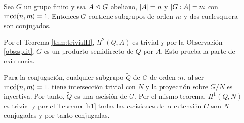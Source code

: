
\begin{teorema}\label{thmschurab} Sea $G$ un grupo finito y sea $A \trianglelefteq G$ abeliano, $\left|A\right|=n$ y $\left|G:A\right|=m$ con $\operatorname{mcd}(n,m)=1$. Entonces $G$ contiene subgrupos de orden $m$ y dos cualesquiera son conjugados.
	\begin{demostracion}
%		
%		

		Por el Teorema \ref{thm:trivialH}, $H^2(Q,A)$ es trivial y por la Observación \ref{obs:split}, $G$ es un producto semidirecto de $Q$ por $A$. Esto prueba la parte de existencia.
		
		Para la conjugación, cualquier subgrupo $\tilde Q$ de $G$ de orden $m$, al ser $\operatorname{mcd}(n,m)=1$, tiene intersección trivial con $N$ y la proyección sobre $G/N$ es inyectiva. Por tanto, $\tilde Q$ es una escisión de $G$. Por el mismo teorema, $H^1(Q,N)$ es trivial y por el Teorema \ref{h1} todas las escisiones de la extensión $G$ son $N$-conjugadas y por tanto conjugadas. 
	\end{demostracion}
\end{teorema}